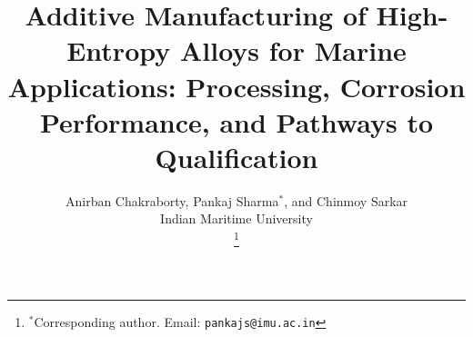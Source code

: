 \documentclass[journal,10pt,twocolumn]{IEEEtran}
\begin{document}
\title{Additive Manufacturing of High-Entropy Alloys for Marine Applications: Processing, Corrosion Performance, and Pathways to Qualification}

\author{Anirban Chakraborty, Pankaj Sharma$^*$, and Chinmoy Sarkar\\
Indian Maritime University\\
\thanks{$^*$Corresponding author. Email: \texttt{pankajs@imu.ac.in}}}

\maketitle















\end{document}
